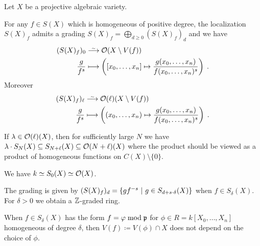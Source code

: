 \documentclass[a4paper,parskip=half,numbers=enddot, DIV=12]{scrreprt}
\begin{document}
\begin{thm}
    Let $X$ be a projective algebraic variety. 
    \begin{alphanumerate}    
      \item 
        For any $f\in S(X)$ which is homogeneous of positive degree, the localization $S(X)_f$ admits a grading $S(X)_f=\bigoplus_{d\geq 0}(S(X)_f)_d$  and we have
        \begin{align*}
            (S(X)_f)_0 &\isomorphism \Oo(X\setminus V(f))\\
            \frac{g}{f^s} &\longmapsto \left([x_0,\ldots,x_n] \mapsto \frac{g(x_0,\ldots,x_n)}{f(x_0,\ldots, x_n)^s}\right)\;.
        \end{align*}
        Moreover
        \begin{align*}
            (S(X)_f)_\ell &\isomorphism \Oo(\ell)(X\setminus V(f)) \\
            \frac{g}{f^s} &\longmapsto \left((x_0,\ldots,x_n) \mapsto \frac{g(x_0,\ldots,x_n)}{f(x_0,\ldots, x_n)^s}\right)\;.
        \end{align*}
      \item 
        If $\lambda\in\mathcal{O}(\ell)(X)$, then for sufficiently large $N$ we have $\lambda\cdot S_N(X)\subseteq S_{N+\ell}(X)\subseteq \mathcal{O}(N+\ell)(X)$ where the product should be viewed as a product of homogeneous functions on $C(X)\setminus \{0\}$.
      \item 
         We have $k\simeq S_0(X)\simeq\mathcal{O}(X)$.
    \end{alphanumerate}
\end{thm}
\begin{rem*}
    \begin{alphanumerate}
        \item 
            The grading is given by $(S(X)_f)_d =\left\{gf^{-s}\ \middle|\  g\in S_{d+s\cdot \delta}(X)\right\}$ when $f\in S_\delta(X)$. For $\delta>0$ we obtain a $\mathbb{Z}$-graded ring.
        \item 
            When $f\in S_\delta(X)$ has the form $f=\varphi \bmod \mathfrak{p}$ for $\phi \in R = k[X_0,\ldots, X_n]$ homogeneous of degree $\delta$, then $V(f)\coloneqq V(\phi)\cap X$ does not depend on the choice of $\phi$.
    \end{alphanumerate}
\end{rem*}
\end{document}
